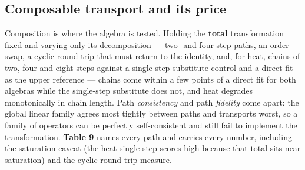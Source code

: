 \subsection{Composable transport and its price}

Composition is where the algebra is tested. Holding the \textbf{total} transformation fixed and varying only its decomposition --- two- and four-step paths, an order swap, a cyclic round trip that must return to the identity, and, for heat, chains of two, four and eight steps against a single-step substitute control and a direct fit as the upper reference --- chains come within a few points of a direct fit for both algebras while the single-step substitute does not, and heat degrades monotonically in chain length. Path \textit{consistency} and path \textit{fidelity} come apart: the global linear family agrees most tightly between paths and transports worst, so a family of operators can be perfectly self-consistent and still fail to implement the transformation. \textbf{Table 9} names every path and carries every number, including the saturation caveat (the heat single step scores high because that total sits near saturation) and the cyclic round-trip measure.


